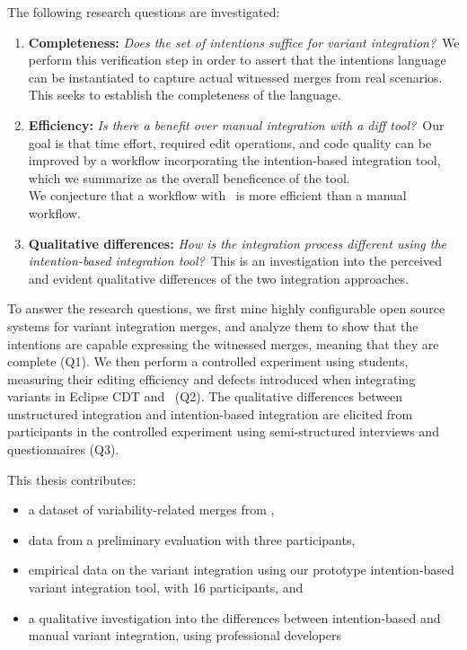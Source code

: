 The following research questions are investigated:

\newcommand{\RQA}{Does the set of intentions suffice for variant integration?}
\newcommand{\RQB}{Is there a benefit over manual integration with a diff tool?}
\newcommand{\RQC}{How is the integration process different using the intention-based integration tool?}

\begin{enumerate}[label={Q\arabic*}]

        \item\label{rq-a} \textbf{Completeness:} \textit{\RQA}~We perform this verification step in order to assert that the intentions language can be instantiated to capture actual witnessed merges from real scenarios. This seeks to establish the completeness of the language.

        \item\label{rq-b} \textbf{Efficiency:} \textit{\RQB}~Our goal is that time effort, required edit operations, and code quality can be improved by a workflow incorporating the intention-based integration tool, which we summarize as the overall beneficence of the tool.\\
        We conjecture that a workflow with \tooln~is more efficient than a manual workflow.
        
        \item\label{rq-c} \textbf{Qualitative differences:} \textit{\RQC}~This is an investigation into the perceived and evident qualitative differences of the two integration approaches.
        
\end{enumerate}

To answer the research questions, we first mine highly configurable open source systems for variant integration merges, and analyze them to show that the intentions are capable expressing the witnessed merges, meaning that they are complete (Q1). We then perform a controlled experiment using students, measuring their editing efficiency and defects introduced when integrating variants in Eclipse CDT and \tooln~(Q2). The qualitative differences between unstructured integration and intention-based integration are elicited from participants in the controlled experiment using semi-structured interviews and questionnaires (Q3).

This thesis contributes:
\begin{itemize}
    \item a dataset of variability-related merges from \marlin,
    \item data from a preliminary evaluation with three participants,
    \item empirical data on the variant integration using our prototype intention-based variant integration tool, with 16 participants, and
    \item a qualitative investigation into the differences between intention-based and manual variant integration, using professional developers
\end{itemize}


